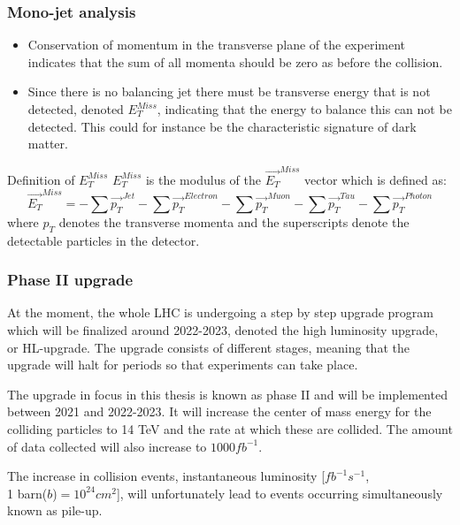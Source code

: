 \documentclass[handout]{beamer}
\begin{document}
\begin{frame}[shrink=10]\frametitle{Mono-jet analysis}
\begin{block}{}
\begin{itemize}
\item Conservation of momentum in the transverse plane of the experiment indicates that the sum of all momenta should be zero as before the collision.

\item Since there is no balancing jet there must be transverse energy that is not detected, denoted $E_T^{Miss}$, indicating that the energy to balance this can not be detected. This could for instance be the characteristic signature of dark matter.
\end{itemize}
\end{block}
\begin{block}{Definition of $E_T^{Miss}$}
$E_T^{Miss}$ is the modulus of the $\vec{E_T}^{Miss}$ vector which is defined as:
\begin{equation*}
\vec{E_T}^{Miss} = - \sum \vec{p_T}^{Jet} - \sum \vec{p_T}^{Electron} - \sum \vec{p_T}^{Muon} - \sum \vec{p_T}^{Tau} - \sum \vec{p_T}^{Photon}
\end{equation*}  
where $p_T$ denotes the transverse momenta and the superscripts denote the detectable particles in the detector.
\end{block}


\end{frame}



\begin{frame}[shrink=10]\frametitle{Phase II upgrade}
\begin{block}{}
At the moment, the whole LHC is undergoing a step by step upgrade program which will be finalized around 2022-2023, denoted the high luminosity upgrade, or HL-upgrade. The upgrade consists of different stages, meaning that the upgrade
will halt for periods so that experiments can take place.
\end{block}
\begin{block}{}
The upgrade in focus in this thesis is known as phase II and will be implemented between 2021 and 2022-2023. It will increase the center of mass energy for the colliding particles to 14 TeV and the rate at which these are collided. The amount of data collected will also increase to $1000 fb^{-1}$.
\end{block}
\begin{block}{}
The increase in collision events, instantaneous luminosity [$fb^{-1}s^{-1}$, \\ 1 barn($b$)$= 10^{24} cm^2$], will unfortunately lead to events occurring simultaneously known as pile-up.
\end{block}
\end{frame}
\end{document}

